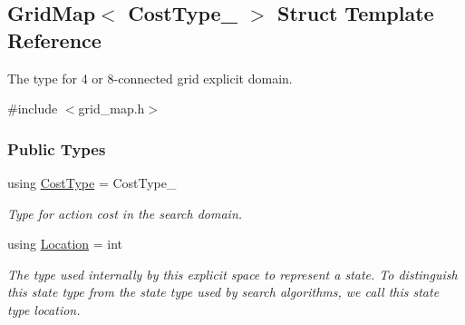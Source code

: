 \hypertarget{structGridMap}{}\subsection{Grid\+Map$<$ Cost\+Type\+\_\+ $>$ Struct Template Reference}
\label{structGridMap}


The type for 4 or 8-\/connected grid explicit domain.  




{\ttfamily \#include $<$grid\+\_\+map.\+h$>$}

\subsubsection*{Public Types}
\begin{DoxyCompactItemize}
\item 
using \hyperlink{structGridMap_a5ed73d957b225bb6d3e4a1b2c27902c8}{Cost\+Type} = Cost\+Type\+\_\+\hypertarget{structGridMap_a5ed73d957b225bb6d3e4a1b2c27902c8}{}\label{structGridMap_a5ed73d957b225bb6d3e4a1b2c27902c8}

\begin{DoxyCompactList}\small\item\em Type for action cost in the search domain. \end{DoxyCompactList}\item 
using \hyperlink{structGridMap_ad3b51a1e56e84f0548a80ed647ea359c}{Location} = int\hypertarget{structGridMap_ad3b51a1e56e84f0548a80ed647ea359c}{}\label{structGridMap_ad3b51a1e56e84f0548a80ed647ea359c}

\begin{DoxyCompactList}\small\item\em The type used internally by this explicit space to represent a state. To distinguish this state type from the state type used by search algorithms, we call this state type {\ttfamily location}. \end{DoxyCompactList}\end{DoxyCompactItemize}
